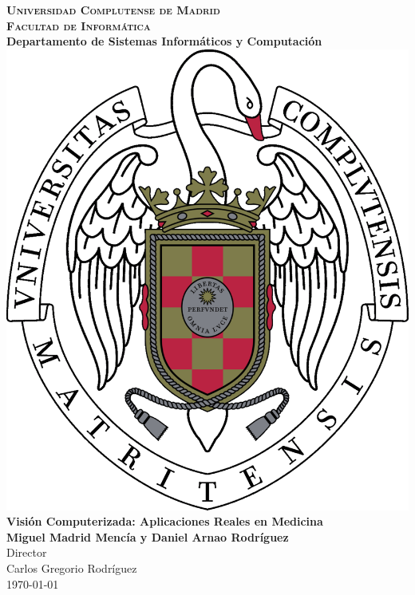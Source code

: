 
\begin{titlepage}
\begin{center}

  \textbf{\textsc{\LARGE Universidad Complutense de Madrid}}\\[1cm]
  \textbf{\textsc{\Large Facultad de Informática}}\\
  \textbf{Departamento de Sistemas Informáticos y Computación}\\[2cm]
  \includegraphics[scale=0.17]{imagenes/logo-ucm.pdf}\\[2cm]
  \textbf{\LARGE Visión Computerizada: Aplicaciones Reales en Medicina}\\[1cm]
  \textbf{\large Miguel Madrid Mencía y Daniel Arnao Rodríguez}\\[2cm]
  Director\\
  \large Carlos Gregorio Rodríguez\\
  \vfill
  \today
\end{center}
\end{titlepage}
